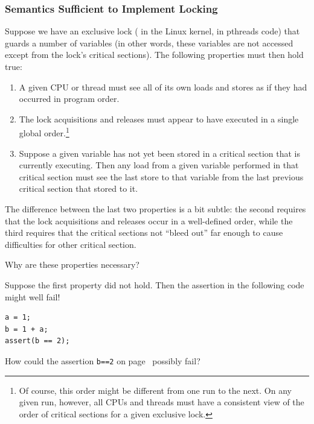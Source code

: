 \subsubsection{Semantics Sufficient to Implement Locking}

Suppose we have an exclusive lock ( in the Linux
kernel,  in pthreads code) that guards a number
of variables (in other words, these variables are not accessed except
from the lock's critical sections).
The following properties must then hold true:
\begin{enumerate}
\item	A given CPU or thread must see all of its own loads and stores
	as if they had occurred in program order.
\item	The lock acquisitions and releases must appear to have executed
	in a single global order.\footnote{
		Of course, this order might be different from one run
		to the next.
		On any given run, however, all CPUs and threads must
		have a consistent view of the order of critical sections
		for a given exclusive lock.}
\item	Suppose a given variable has not yet been stored in a
	critical section that is currently executing.
	Then any load from a given variable performed in that critical section
	must see the last store to that variable from the last previous
	critical section that stored to it.
\end{enumerate}

The difference between the last two properties is a bit subtle:
the second requires that the lock acquisitions and releases occur
in a well-defined order, while the third requires that the critical
sections not ``bleed out'' far enough to cause difficulties for
other critical section.

Why are these properties necessary?

Suppose the first property did not hold.
Then the assertion in the following code might well fail!

\vspace{5pt}
\begin{minipage}[t]{\columnwidth}
\scriptsize
\begin{verbatim}
a = 1;
b = 1 + a;
assert(b == 2);
\end{verbatim}
\end{minipage}
\label{codesample:advsync:What Can You Count On? 1}
\vspace{5pt}

\QuickQuiz{}
	How could the assertion {\tt b==2} on
	page~\pageref{codesample:advsync:What Can You Count On? 1}
	possibly fail?
 \QuickQuizEnd

